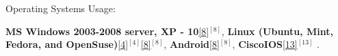 \begin{cventries}
%    
%    
  \cventry
    {Operating Systems Usage:} %
    {} 
    {} 
    {} 
    {
      \begin{cvitems} %
        \item {
        \textbf{MS Windows 2003-2008 server, XP - 10}\ref{8}{$^{[8]}$}, 
        \textbf{Linux (Ubuntu, Mint, Fedora, and OpenSuse)}\ref{4}{$^{[4]}$}\ref{8}{$^{[8]}$}, 
        \textbf{Android}\ref{8}{$^{[8]}$}, 
        \textbf{CiscoIOS}\ref{13}{$^{[13]}$}%
        .} 
      \end{cvitems}
    }  
  \vspace{-0.4cm} 
    



\end{cventries}
